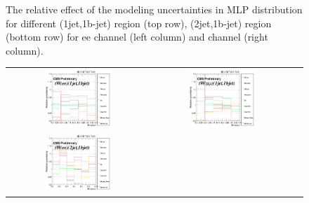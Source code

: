 \begin{figure}[ht]
\begin{center}
\begin{tabular}{ccc}
    \end{tabular}
    \caption{The relative effect of the \ttbar modeling uncertainties in MLP distribution for different (1jet,1b-jet) region (top row), (2jet,1b-jet) region (bottom row) for ee channel (left column) and \mumu channel (right column).
    \label{fig:uncert_TT}}
  \end{center}
\end{figure}

\begin{figure}[ht]
  \begin{center}
    \begin{tabular}{ccc}
      \includegraphics[width=0.49\textwidth]{figures/tW/fig/Step2/uncertainties/ee/TW_Samples_H_MLP_1jet_1bjet_comb.png} &
      \includegraphics[width=0.49\textwidth]{figures/tW/fig/Step2/uncertainties/mumu/TW_Samples_H_MLP_1jet_1bjet_comb.png}\\
      \includegraphics[width=0.49\textwidth]{figures/tW/fig/Step2/uncertainties/ee/TW_Samples_H_MLP_2jet_1bjet_comb.png} &

\end{tabular}
\end{center}
\end{figure}

